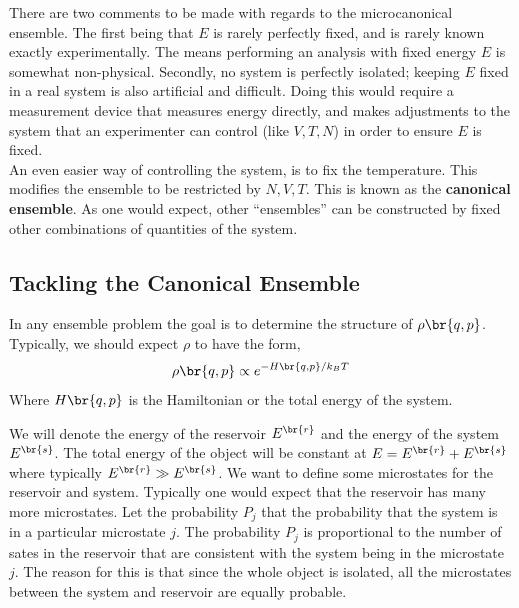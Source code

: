 \documentclass{article}
\begin{document}
There are two comments to be made with regards to the microcanonical ensemble. The first being that $E$ is rarely perfectly fixed, and is rarely known exactly experimentally. The means performing an analysis with fixed energy $E$ is somewhat non-physical. Secondly, no system is perfectly isolated; keeping $E$ fixed in a real system is also artificial and difficult. Doing this would require a measurement device that measures energy directly, and makes adjustments to the system that an experimenter can control (like $V, T, N$) in order to ensure $E$ is fixed. \\

An even easier way of controlling the system, is to fix the temperature. This modifies the ensemble to be restricted by $N, V, T$. This is known as the \textbf{canonical ensemble}. As one would expect, other ``ensembles'' can be constructed by fixed other combinations of quantities of the system.

\subsection{Tackling the Canonical Ensemble}
In any ensemble problem the goal is to determine the structure of $\rho\br{q,p}$. Typically, we should expect $\rho$ to have the form,
\[ \rho\br{q,p} \propto e^{-H\br{q,p}/k_BT} \]
Where $H\br{q,p}$ is the Hamiltonian or the total energy of the system.
\begin{center}
\end{center}

We will denote the energy of the reservoir $E^{\br{r}}$ and the energy of the system $E^{\br{s}}$. The total energy of the object will be constant at $E = E^{\br{r}} + E^{\br{s}}$ where typically $E^{\br{r}} \gg E^{\br{s}}$. We want to define some microstates for the reservoir and system. Typically one would expect that the reservoir has many more microstates. Let the probability $P_j$ that the probability that the system is in a particular microstate $j$. The probability $P_j$ is proportional to the number of sates in the reservoir that are consistent with the system being in the microstate $j$. The reason for this is that since the whole object is isolated, all the microstates between the system and reservoir are equally probable. \\
\end{document}

